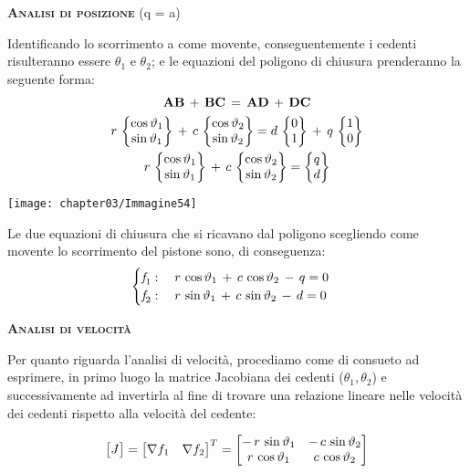 	\begin{center}
	{\scshape{\bfseries Analisi di posizione}} (q = a)
	\end{center}
	
	\begin{minipage}{.5\textwidth}
		Identificando lo scorrimento a come movente, conseguentemente i cedenti risulteranno essere $\theta_1$ e $\theta_2$; e le equazioni del poligono di chiusura prenderanno la seguente forma:
		\begin{gather*}
			\mathbf{AB}\,+\, \mathbf{BC}\,=\,\mathbf{AD}\,+\,\mathbf{DC}\\
			r\,\B{\cos{\theta_1}\\\sin{\theta_1}}\,+\,c\,\B{\cos{\theta_2}\\\sin{\theta_2}} = d\,\B{0\\1}\,+\,q\,\B{1\\0}\\
			r\,\B{\cos{\theta_1}\\\sin{\theta_1}}\,+\,c\,\B{\cos{\theta_2}\\\sin{\theta_2}} = \B{q\\d}	
		\end{gather*}
	\end{minipage}
	\hfill
	\begin{minipage}{.5\textwidth}
		\centering
		\texttt{[image: chapter03/Immagine54]}
	\end{minipage}
	
	Le due equazioni di chiusura che si ricavano dal poligono scegliendo come movente lo scorrimento del pistone sono, di conseguenza:
	\[
	\begin{cases}
		\emph{f}_1:\quad r\,\cos{\theta_1}\,+\,c\,\cos{\theta_2}\,-\,q=0\\
		\emph{f}_2:\quad r\,\sin{\theta_1}\,+\,c\,\sin{\theta_2}\,-\,d=0
	\end{cases}
	\]
	
	\begin{center}
	{\scshape{\bfseries Analisi di velocità}}
	\end{center}
	
	Per quanto riguarda l'analisi di velocità, procediamo come di consueto ad esprimere, in primo luogo la matrice Jacobiana dei cedenti ($\theta_1, \theta_2$) e successivamente ad invertirla al fine di trovare una relazione lineare nelle velocità dei cedenti rispetto alla velocità del cedente:
	
	\begin{equation*}
	 	\M{J} = \M{\nabla{f_1}&\nabla{f_2}}^T =  \M{-\,r\,\sin{\theta_1}& -\,c\,\sin{\theta_2}\\r\,\cos{\theta_1}&c\,\cos{\theta_2}}
	\end{equation*}
		
